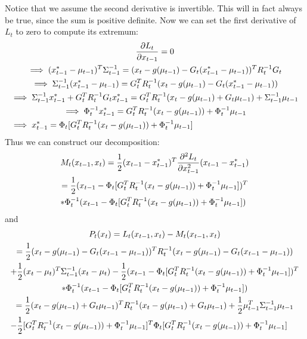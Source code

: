 Notice that we assume the second derivative is invertible. This will in fact always be true, since the sum is positive definite. Now we can set the first derivative of \(L_t\) to zero to compute its extremum:
\begin{multline}
\frac{\partial L_t}{\partial x_{t-1}} = 0 \\
\implies (x_{t-1}^* - \mu_{t-1})^T \Sigma_{t-1}^{-1} = (x_t - g(\mu_{t-1}) - G_t (x_{t-1}^* - \mu_{t-1}))^T R_t^{-1} G_t \\
\implies \Sigma_{t-1}^{-1} (x_{t-1}^* - \mu_{t-1}) = G_t^T R_t^{-1}  (x_t - g(\mu_{t-1}) - G_t (x_{t-1}^* - \mu_{t-1})) \\
\implies \Sigma_{t-1}^{-1} x_{t-1}^* + G_t^T R_t^{-1}G_t x_{t-1}^* = G_t^T R_t^{-1}  (x_t - g(\mu_{t-1}) + G_t \mu_{t-1}) + \Sigma_{t-1}^{-1} \mu_{t-1} \\
\implies \Phi_t^{-1} x_{t-1}^* = G_t^T R_t^{-1}  (x_t - g(\mu_{t-1})) + \Phi_t^{-1} \mu_{t-1} \\
\implies x_{t-1}^* = \Phi_t [G_t^T R_t^{-1}  (x_t - g(\mu_{t-1})) + \Phi_t^{-1} \mu_{t-1}] \hfill
\end{multline}
Thus we can construct our decomposition:
\begin{multline*}
M_t(x_{t-1},x_t) = \frac{1}{2} (x_{t-1} - x_{t-1}^*)^T \frac{\partial^2 L_t}{\partial x_{t-1}^2} (x_{t-1} - x_{t-1}^*) \\
= \frac{1}{2} (x_{t-1} - \Phi_t [G_t^T R_t^{-1}  (x_t - g(\mu_{t-1})) + \Phi_t^{-1} \mu_{t-1}])^T \\
* \Phi_t^{-1} (x_{t-1} - \Phi_t [G_t^T R_t^{-1}  (x_t - g(\mu_{t-1})) + \Phi_t^{-1} \mu_{t-1}]) \hfill
\end{multline*}
and
\begin{multline} \label{eqDefPt}
P_t(x_t) = L_t(x_{t-1},x_t) -  M_t(x_{t-1},x_t) \\
= \frac{1}{2} (x_t - g(\mu_{t-1}) - G_t (x_{t-1} - \mu_{t-1}))^T R_t^{-1} (x_t - g(\mu_{t-1}) - G_t (x_{t-1} - \mu_{t-1}))\\
+ \frac{1}{2} (x_t - \mu_t)^T \Sigma_{t-1}^{-1} (x_t - \mu_t) - \frac{1}{2} (x_{t-1} - \Phi_t [G_t^T R_t^{-1}  (x_t - g(\mu_{t-1})) + \Phi_t^{-1} \mu_{t-1}])^T \\
* \Phi_t^{-1} (x_{t-1} - \Phi_t [G_t^T R_t^{-1}  (x_t - g(\mu_{t-1})) + \Phi_t^{-1} \mu_{t-1}]) \\
= \frac{1}{2} (x_t - g(\mu_{t-1}) + G_t \mu_{t-1})^T R_t^{-1} (x_t - g(\mu_{t-1}) + G_t \mu_{t-1}) + \frac{1}{2} \mu_{t-1}^T \Sigma_{t-1}^{-1} \mu_{t-1} \\
- \frac{1}{2} [G_t^T R_t^{-1}  (x_t - g(\mu_{t-1})) + \Phi_t^{-1} \mu_{t-1}]^T \Phi_t [G_t^T R_t^{-1}  (x_t - g(\mu_{t-1})) + \Phi_t^{-1} \mu_{t-1}] \hfill
\end{multline}
